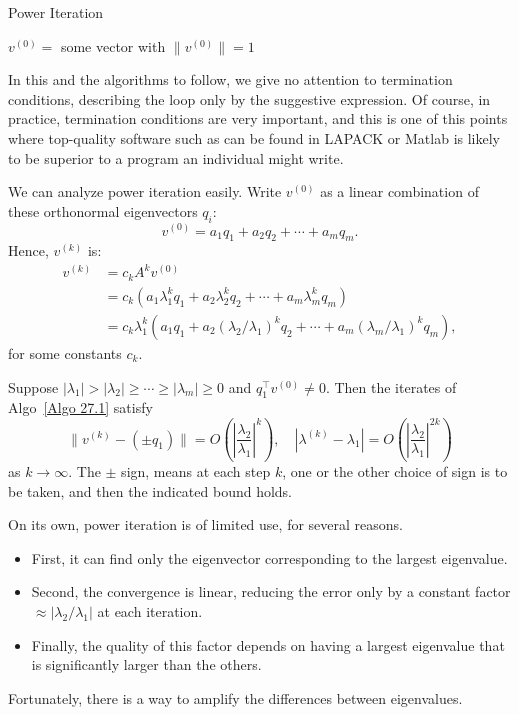  \begin{algorithm}[H]
     \caption{Power Iteration}
     \label{Algo 27.1}
$ v^{(0)}= $ some vector with $ \|v^{(0)}\|=1 $\; 
 \end{algorithm}
 In this and the algorithms to follow, we give no attention to termination conditions, describing the loop only by the suggestive expression. Of course, in practice, termination conditions are very important, and this is one of this points where top-quality software such as can be found in LAPACK or Matlab is likely to be superior to a program an individual might write.  

 We can analyze power iteration easily. Write $v^{(0)}$ as a linear combination of these orthonormal eigenvectors $q_i$: 
 \[
    v^{(0)} = a_1q_1 + a_2 q_2 + \cdots +a_mq_m. 
 \]
Hence, $v^{(k)}$ is: 
\begin{align*}
    v^{(k)} 
    &= c_k A^k v^{(0)}\\ 
    &= c_k (a_1 \lambda _1^k q_1 + a_2 \lambda _2^k q_2 + \cdots + a_m \lambda _m^k q_m) \\ 
    &= c_k \lambda _1^k ( a_1 q_1 + a_2 (\lambda _2 /\lambda _1)^k q_2 + \cdots + a_m (\lambda _m / \lambda _1)^k q_m),
\end{align*}
for some constants $c_k$. 


\begin{theorem}
\label{thm: convergence power iteration}
Suppose $ |\lambda _1| > |\lambda _2| \ge \cdots \ge |\lambda _m| \ge 0 $ and $q_1^\top  v^{(0)} \neq 0$. Then the iterates of Algo~\ref{Algo 27.1} satisfy 
\begin{equation}
\label{eq: convergence power iteration}
    \|v^{(k)} - (\pm q_1) \| = O\left( \left| \frac{\lambda _2}{\lambda _1} \right| ^k \right), \quad |\lambda ^{(k)} - \lambda _1| = O \left( \left| \frac{\lambda _2}{\lambda _1} \right| ^{2k} \right)   
\end{equation}
as $k\to \infty$. The $\pm$ sign, means at each step $k$, one or the other choice of sign is to be taken, and then the indicated bound holds.  
\end{theorem}
On its own, power iteration is of limited use, for several reasons. 
\begin{itemize}
    \item First, it can find only the eigenvector corresponding to the largest eigenvalue. 
    \item Second, the convergence is linear, reducing the error only by a constant factor $ \approx |\lambda _2 / \lambda _1| $ at each iteration. 
    \item Finally, the quality of this factor depends on having a largest eigenvalue that is significantly larger than the others.  
\end{itemize}
Fortunately, there is a way to amplify the differences between eigenvalues.  


